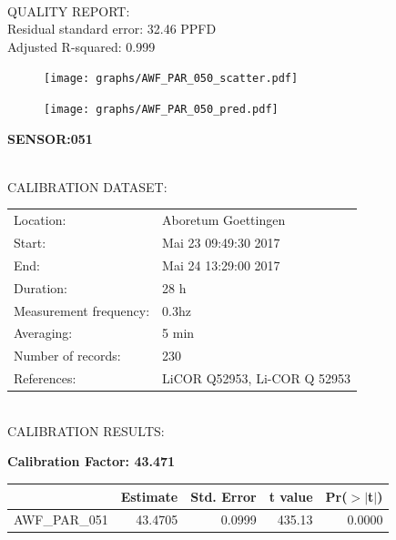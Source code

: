 \documentclass[oneside]{report}
\begin{document}
\hrulefill\\
QUALITY REPORT:\\
Residual standard error: 32.46 PPFD\\
Adjusted R-squared: 0.999



\begin{figure}[H]
  \centering
  \texttt{[image: graphs/AWF\_PAR\_050\_scatter.pdf]}
\end{figure}




\begin{figure}[H]
  \centering
  \texttt{[image: graphs/AWF\_PAR\_050\_pred.pdf]}
\end{figure}

\pagebreak


\begin{center}
\large{\textbf{SENSOR:051}}\\
\end{center}

\hrulefill\\
CALIBRATION DATASET:\\
\begin{table}[h!]
  \centering
  \label{tab:table1}
  \begin{tabular}{ll}
    Location: & Aboretum Goettingen\\ 
    
    
    Start:  & Mai 23 09:49:30 2017 \\
    End:   & Mai 24 13:29:00 2017\\ 
    Duration: & 28 h\\
    Measurement frequency: & 0.3hz\\
    Averaging:  &5 min\\
    Number of records: & 230 \\
    References: & LiCOR Q52953, Li-COR Q 52953 \\
  \end{tabular}
\end{table}

\hrulefill\\
CALIBRATION RESULTS:\\


\begin{center}
\textbf{\large{Calibration Factor: 43.471}}\\
\end{center}
\begin{table}[ht]
\centering
\begin{tabular}{rrrrr}
  \hline
 & Estimate & Std. Error & t value & Pr($>$$|$t$|$) \\ 
  \hline
AWF\_PAR\_051 & 43.4705 & 0.0999 & 435.13 & 0.0000 \\ 
   \hline
\end{tabular}
\end{table}
\end{document}
